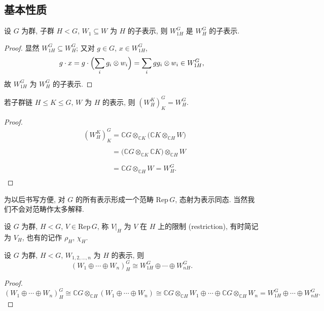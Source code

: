 \subsection{基本性质}

\begin{proposition}\label{prop:induction-subrep}
设 $G$ 为群, 子群 $H<G$, $W_1\subseteq W$ 为 $H$ 的子表示, 则 $W_{1H}^{G}$ 是 $W_H^G$ 的子表示.
\end{proposition}

\begin{proof}
显然 $W_{1H}^{G}\subseteq W_H^{G}$; 又对 $g\in G$, $x\in W_{1H}^{G}$,
\[
  g\cdot x=g\cdot\Bigl(\sum_i g_i\otimes w_i\Bigr)=\sum_i gg_i\otimes w_i\in W_{1H}^{G},
\]
故 $W_{1H}^{G}$ 为 $W_H^{G}$ 的子表示.
\end{proof}

\begin{proposition}[传递性]\label{prop:induction-transitive}
若子群链 $H\le K\le G$, $W$ 为 $H$ 的表示, 则 $(W_H^K)_K^G=W_H^G$.
\end{proposition}

\begin{proof}
\[\begin{aligned}
  &(W_H^K)_K^G=\mathbb{C}G\otimes_{\mathbb{C}K}\bigl(\mathbb{C}K\otimes_{\mathbb{C}H}W\bigr)\\
  &\phantom{(W_H^K)_K^G}=\bigl(\mathbb{C}G\otimes_{\mathbb{C}K}\mathbb{C}K\bigr)\otimes_{\mathbb{C}H}W\\
  &\phantom{(W_H^K)_K^G}=\mathbb{C}G\otimes_{\mathbb{C}H}W=W_H^G .
\end{aligned}\]
\end{proof}

为以后书写方便, 对 $G$ 的所有表示形成一个范畴 $\mathrm{Rep}\,G$, 态射为表示同态.
当然我们不会对范畴作太多解释.

\begin{definition}[限制]\label{def:restriction}
设 $G$ 为群, $H<G$, $V\in\mathrm{Rep}\,G$, 称 $V|_H$ 为 $V$ 在 $H$ 上的限制 (restriction),
有时简记为 $V_H$, 也有的记作 $\rho_H$, $\chi_H$.
\end{definition}

\begin{lemma}\label{lem:induction-direct-sum}
设 $G$ 为群, $H<G$, $W_{1,2,\dots,n}$ 为 $H$ 的表示, 则
\[
  (W_1\oplus\cdots\oplus W_n)_H^G\cong W_{1H}^G\oplus\cdots\oplus W_{nH}^G .
\]
\end{lemma}

\begin{proof}
\[
  (W_1\oplus\cdots\oplus W_n)_H^G\cong\mathbb{C}G\otimes_{\mathbb{C}H}(W_1\oplus\cdots\oplus W_n)
  \cong\mathbb{C}G\otimes_{\mathbb{C}H}W_1\oplus\cdots\oplus\mathbb{C}G\otimes_{\mathbb{C}H}W_n
  =W_{1H}^G\oplus\cdots\oplus W_{nH}^G .
\]
\end{proof}

